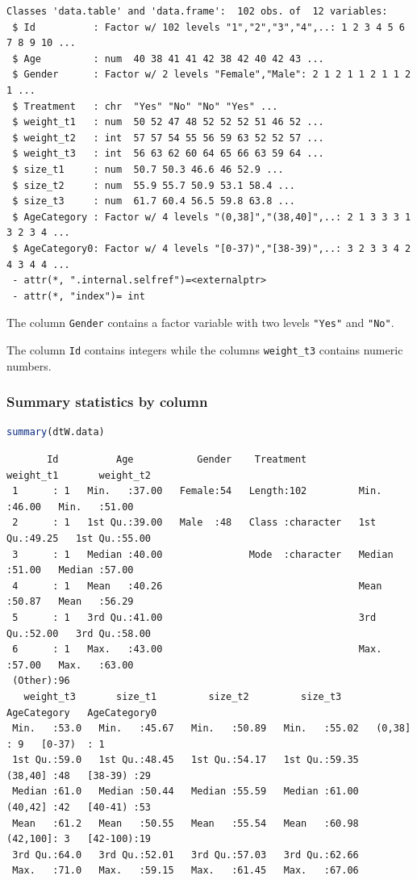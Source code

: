 \documentclass{article}
\begin{document}
\label{}
\begin{verbatim}
Classes 'data.table' and 'data.frame':	102 obs. of  12 variables:
 $ Id          : Factor w/ 102 levels "1","2","3","4",..: 1 2 3 4 5 6 7 8 9 10 ...
 $ Age         : num  40 38 41 41 42 38 42 40 42 43 ...
 $ Gender      : Factor w/ 2 levels "Female","Male": 2 1 2 1 1 2 1 1 2 1 ...
 $ Treatment   : chr  "Yes" "No" "No" "Yes" ...
 $ weight_t1   : num  50 52 47 48 52 52 52 51 46 52 ...
 $ weight_t2   : int  57 57 54 55 56 59 63 52 52 57 ...
 $ weight_t3   : int  56 63 62 60 64 65 66 63 59 64 ...
 $ size_t1     : num  50.7 50.3 46.6 46 52.9 ...
 $ size_t2     : num  55.9 55.7 50.9 53.1 58.4 ...
 $ size_t3     : num  61.7 60.4 56.5 59.8 63.8 ...
 $ AgeCategory : Factor w/ 4 levels "(0,38]","(38,40]",..: 2 1 3 3 3 1 3 2 3 4 ...
 $ AgeCategory0: Factor w/ 4 levels "[0-37)","[38-39)",..: 3 2 3 3 4 2 4 3 4 4 ...
 - attr(*, ".internal.selfref")=<externalptr> 
 - attr(*, "index")= int
\end{verbatim}

The column \texttt{Gender} contains a factor variable with two levels \texttt{"Yes"}
and \texttt{"No"}. 

The column \texttt{Id} contains integers while the columns \texttt{weight\_t3}
contains numeric numbers.
\subsubsection{Summary statistics by column}
\label{sec:org328f29f}
\begin{lstlisting}[language=r,numbers=none]
summary(dtW.data)
\end{lstlisting}

\label{}
\begin{verbatim}
       Id          Age           Gender    Treatment           weight_t1       weight_t2    
 1      : 1   Min.   :37.00   Female:54   Length:102         Min.   :46.00   Min.   :51.00  
 2      : 1   1st Qu.:39.00   Male  :48   Class :character   1st Qu.:49.25   1st Qu.:55.00  
 3      : 1   Median :40.00               Mode  :character   Median :51.00   Median :57.00  
 4      : 1   Mean   :40.26                                  Mean   :50.87   Mean   :56.29  
 5      : 1   3rd Qu.:41.00                                  3rd Qu.:52.00   3rd Qu.:58.00  
 6      : 1   Max.   :43.00                                  Max.   :57.00   Max.   :63.00  
 (Other):96                                                                                 
   weight_t3       size_t1         size_t2         size_t3        AgeCategory   AgeCategory0
 Min.   :53.0   Min.   :45.67   Min.   :50.89   Min.   :55.02   (0,38]  : 9   [0-37)  : 1   
 1st Qu.:59.0   1st Qu.:48.45   1st Qu.:54.17   1st Qu.:59.35   (38,40] :48   [38-39) :29   
 Median :61.0   Median :50.44   Median :55.59   Median :61.00   (40,42] :42   [40-41) :53   
 Mean   :61.2   Mean   :50.55   Mean   :55.54   Mean   :60.98   (42,100]: 3   [42-100):19   
 3rd Qu.:64.0   3rd Qu.:52.01   3rd Qu.:57.03   3rd Qu.:62.66                               
 Max.   :71.0   Max.   :59.15   Max.   :61.45   Max.   :67.06
\end{verbatim}
\end{document}
